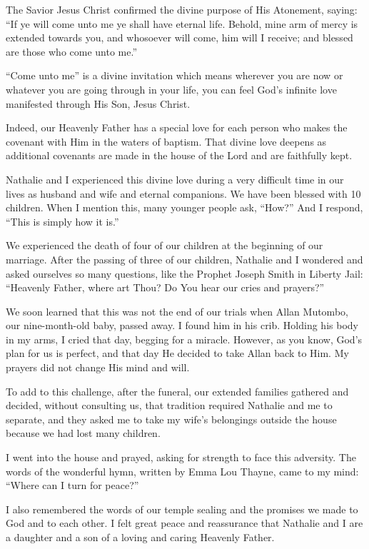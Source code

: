\documentclass[letterpaper, 11pt]{report}
\begin{document}
The Savior Jesus Christ confirmed the divine purpose of His Atonement, saying: “If ye will come unto me ye shall have eternal life. Behold, mine arm of mercy is extended towards you, and whosoever will come, him will I receive; and blessed are those who come unto me.”

“Come unto me” is a divine invitation which means wherever you are now or whatever you are going through in your life, you can feel God’s infinite love manifested through His Son, Jesus Christ.

Indeed, our Heavenly Father has a special love for each person who makes the covenant with Him in the waters of baptism. That divine love deepens as additional covenants are made in the house of the Lord and are faithfully kept.

Nathalie and I experienced this divine love during a very difficult time in our lives as husband and wife and eternal companions. We have been blessed with 10 children. When I mention this, many younger people ask, “How?” And I respond, “This is simply how it is.”

We experienced the death of four of our children at the beginning of our marriage. After the passing of three of our children, Nathalie and I wondered and asked ourselves so many questions, like the Prophet Joseph Smith in Liberty Jail: “Heavenly Father, where art Thou? Do You hear our cries and prayers?”

We soon learned that this was not the end of our trials when Allan Mutombo, our nine-month-old baby, passed away. I found him in his crib. Holding his body in my arms, I cried that day, begging for a miracle. However, as you know, God’s plan for us is perfect, and that day He decided to take Allan back to Him. My prayers did not change His mind and will.

To add to this challenge, after the funeral, our extended families gathered and decided, without consulting us, that tradition required Nathalie and me to separate, and they asked me to take my wife’s belongings outside the house because we had lost many children.

I went into the house and prayed, asking for strength to face this adversity. The words of the wonderful hymn, written by Emma Lou Thayne, came to my mind: “Where can I turn for peace?”

I also remembered the words of our temple sealing and the promises we made to God and to each other. I felt great peace and reassurance that Nathalie and I are a daughter and a son of a loving and caring Heavenly Father.
\end{document}
